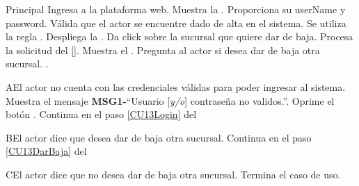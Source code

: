 	\begin{UCtrayectoria}{Principal}
		\UCpaso[\UCactor] Ingresa a la plataforma web.
		\UCpaso Muestra la  \label{CU13Login}.
		\UCpaso[\UCactor] Proporciona su userName y password.
		\UCpaso Válida que el actor se encuentre dado de alta en el sistema. Se utiliza la regla  .
		\UCpaso Despliega la .\label{CU13DarBaja}
		\UCpaso[\UCactor] Da click sobre la sucursal que quiere dar de baja.		
		\UCpaso Procesa la solicitud del [\UCactor].
		\UCpaso Muestra el . 
		\UCpaso Pregunta al actor si desea dar de baja otra sucursal. .
	\end{UCtrayectoria}
		
		\begin{UCtrayectoriaA}{A}{El actor no cuenta con las credenciales válidas para poder ingresar al sistema.}
			\UCpaso Muestra el mensaje {\bf MSG1-}``Usuario [{\em y/o}] contraseña no validos.''.
			\UCpaso[\UCactor] Oprime el botón .
			\UCpaso Continua en el paso \ref{CU13Login} del 
		\end{UCtrayectoriaA}
		
		\begin{UCtrayectoriaA}{B}{El actor dice que desea dar de baja otra sucursal.}
			\UCpaso Continua en el paso \ref{CU13DarBaja} del 
		\end{UCtrayectoriaA}
		
		\begin{UCtrayectoriaA}{C}{El actor dice que no desea dar de baja otra sucursal.}
			\UCpaso Termina el caso de uso.
		\end{UCtrayectoriaA}
